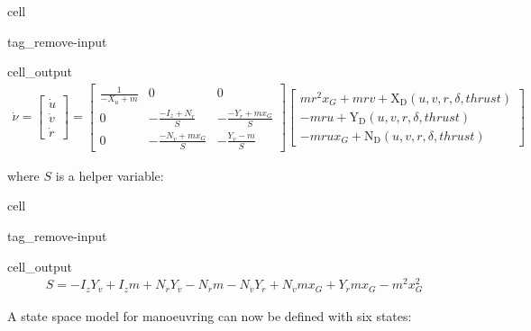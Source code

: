 \documentclass[review]{elsarticle}
\begin{document}
\begin{sphinxuseclass}{cell}
\begin{sphinxuseclass}{tag_remove-input}
\begin{sphinxuseclass}{cell_output}\begin{equation*}
\begin{split}\displaystyle \dot{\nu} = \left[\begin{matrix}\dot{u}\\\dot{v}\\\dot{r}\end{matrix}\right] = \left[\begin{matrix}\frac{1}{- X_{\dot{u}} + m} & 0 & 0\\0 & - \frac{- I_{z} + N_{\dot{r}}}{S} & - \frac{- Y_{\dot{r}} + m x_{G}}{S}\\0 & - \frac{- N_{\dot{v}} + m x_{G}}{S} & - \frac{Y_{\dot{v}} - m}{S}\end{matrix}\right] \left[\begin{matrix}m r^{2} x_{G} + m r v + \operatorname{X_{D}}{\left(u,v,r,\delta,thrust \right)}\\- m r u + \operatorname{Y_{D}}{\left(u,v,r,\delta,thrust \right)}\\- m r u x_{G} + \operatorname{N_{D}}{\left(u,v,r,\delta,thrust \right)}\end{matrix}\right]\end{split}
\end{equation*}
\end{sphinxuseclass}
\end{sphinxuseclass}
\end{sphinxuseclass}
\sphinxAtStartPar
where \(S\) is a helper variable:

\begin{sphinxuseclass}{cell}
\begin{sphinxuseclass}{tag_remove-input}
\begin{sphinxuseclass}{cell_output}\begin{equation*}
\begin{split}\displaystyle S = - I_{z} Y_{\dot{v}} + I_{z} m + N_{\dot{r}} Y_{\dot{v}} - N_{\dot{r}} m - N_{\dot{v}} Y_{\dot{r}} + N_{\dot{v}} m x_{G} + Y_{\dot{r}} m x_{G} - m^{2} x_{G}^{2}\end{split}
\end{equation*}
\end{sphinxuseclass}
\end{sphinxuseclass}
\end{sphinxuseclass}
\sphinxAtStartPar
A state space model for manoeuvring can now be defined with six states:
\end{document}
